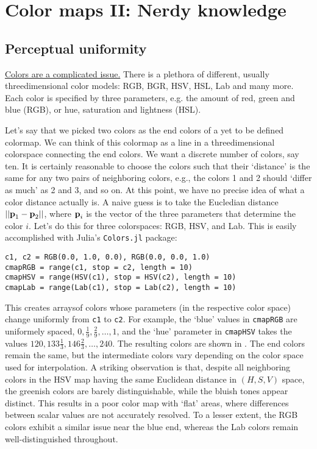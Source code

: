 \section{Color maps II: Nerdy knowledge}
\subsection{Perceptual uniformity}
\href{https://xkcd.com/1882/}{Colors are a complicated issue.} There is a plethora of different, usually threedimensional color models: RGB, BGR, HSV, HSL, Lab and many more. Each color is specified by three parameters, e.g. the amount of red, green and blue (RGB), or hue, saturation and lightness (HSL).   

Let's say that we picked two colors as the end colors of a yet to be defined colormap. We can think of this colormap as a line in a threedimensional colorspace connecting the end colors. We want a discrete number of colors, say ten. It is certainly reasonable to choose the colors such that their `distance' is the same for any two pairs of neighboring colors, e.g., the colors 1 and 2 should `differ as much' as 2 and 3, and so on. At this point, we have no precise idea of what a color distance actually is. A naive guess is to take the Eucledian distance $||\textbf{p}_1-\textbf{p}_2||$, where $\textbf{p}_i$ is the vector of the three parameters that determine the color $i$.  Let's do this for three colorspaces: RGB, HSV, and Lab. This is easily accomplished with Julia's \verb|Colors.jl| package:

\begin{listing}[h]
\begin{verbatim} 
c1, c2 = RGB(0.0, 1.0, 0.0), RGB(0.0, 0.0, 1.0)
cmapRGB = range(c1, stop = c2, length = 10) 
cmapHSV = range(HSV(c1), stop = HSV(c2), length = 10) 
cmapLab = range(Lab(c1), stop = Lab(c2), length = 10) 
\end{verbatim}
\end{listing}

This creates arraysof colors whose parameters (in the respective color space) change uniformly from \verb|c1| to \verb|c2|. For example, the `blue' values in \verb|cmapRGB| are uniformely spaced, $0,\frac{1}{9},\frac{2}{9},\ldots,1$, and the `hue' parameter in \verb|cmapHSV| takes the values $120,133\frac{1}{3},146\frac{2}{3},\ldots,240$.
The resulting colors are shown in . 
The end colors remain the same, but the intermediate colors vary depending on the color space used for interpolation. A striking observation is that, despite all neighboring colors in the HSV map having the same Euclidean distance in $(H, S, V)$ space, the greenish colors are barely distinguishable, while the bluish tones appear distinct. This results in a poor color map with `flat' areas, where differences between scalar values are not accurately resolved. To a lesser extent, the RGB colors exhibit a similar issue near the blue end, whereas the Lab colors remain well-distinguished throughout.

